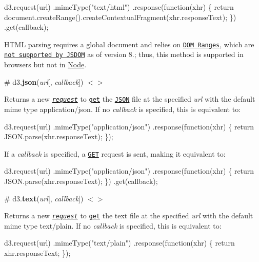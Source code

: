 \begin{DoxyCode}
d3.request(url)
    .mimeType("text/html")
    .response(function(xhr) \{ return document.createRange().createContextualFragment(xhr.responseText); \})
    .get(callback);
\end{DoxyCode}


H\+T\+ML parsing requires a global document and relies on \href{https://dom.spec.whatwg.org/#ranges}{\tt D\+OM Ranges}, which are \href{https://github.com/tmpvar/jsdom/issues/317}{\tt not supported by J\+S\+D\+OM} as of version 8.; thus, this method is supported in browsers but not in \mbox{\hyperlink{classNode}{Node}}.

\label{_json}%
\# d3.{\bfseries json}({\itshape url}\mbox{[}, {\itshape callback}\mbox{]}) \href{https://github.com/d3/d3-request/blob/master/src/json.js}{\tt $<$$>$}

Returns a new \href{#request}{\tt {\itshape request}} to \href{#request_get}{\tt get} the \href{http://json.org}{\tt J\+S\+ON} file at the specified {\itshape url} with the default mime type {\ttfamily application/json}. If no {\itshape callback} is specified, this is equivalent to\+:


\begin{DoxyCode}
d3.request(url)
    .mimeType("application/json")
    .response(function(xhr) \{ return JSON.parse(xhr.responseText); \});
\end{DoxyCode}


If a {\itshape callback} is specified, a \href{#request_get}{\tt G\+ET} request is sent, making it equivalent to\+:


\begin{DoxyCode}
d3.request(url)
    .mimeType("application/json")
    .response(function(xhr) \{ return JSON.parse(xhr.responseText); \})
    .get(callback);
\end{DoxyCode}


\label{_text}%
\# d3.{\bfseries text}({\itshape url}\mbox{[}, {\itshape callback}\mbox{]}) \href{https://github.com/d3/d3-request/blob/master/src/text.js}{\tt $<$$>$}

Returns a new \href{#request}{\tt {\itshape request}} to \href{#request_get}{\tt get} the text file at the specified {\itshape url} with the default mime type {\ttfamily text/plain}. If no {\itshape callback} is specified, this is equivalent to\+:


\begin{DoxyCode}
d3.request(url)
    .mimeType("text/plain")
    .response(function(xhr) \{ return xhr.responseText; \});
\end{DoxyCode}


